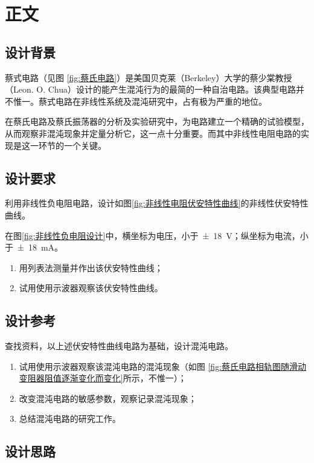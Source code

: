 \documentclass{article}
\begin{document}
\section{正文}%
\label{sec:正文}

\subsection{设计背景}%
\label{sub:设计背景}

蔡式电路（见图 \ref{fig:蔡氏电路}）是美国贝克莱（Berkeley）大学的蔡少棠教授（Leon. O. Chua）设计的能产生混沌行为的最简的一种自治电路。该典型电路并不惟一。蔡式电路在非线性系统及混沌研究中，占有极为严重的地位。

在蔡氏电路及蔡氏振荡器的分析及实验研究中，为电路建立一个精确的试验模型，从而观察非混沌现象并定量分析它，这一点十分重要。而其中非线性电阻电路的实现是这一环节的一个关键。

\subsection{设计要求}%
\label{sub:设计要求}

利用非线性负电阻电路，设计如图\ref{fig:非线性电阻伏安特性曲线}的非线性伏安特性曲线。

在图\ref{fig:非线性负电阻设计}中，横坐标为电压，小于\SI{+-18}{V}；纵坐标为电流，小于\SI{+-18}{mA}。

\begin{enumerate}
	\item 用列表法测量并作出该伏安特性曲线；
	\item 试用使用示波器观察该伏安特性曲线。
\end{enumerate}

\subsection{设计参考}%
\label{sub:设计参考}

查找资料，以上述伏安特性曲线电路为基础，设计混沌电路。

\begin{enumerate}
	\item 试用使用示波器观察该混沌电路的混沌现象（如图 \ref{fig:蔡氏电路相轨图随滑动变阻器阻值逐渐变化而变化}所示，不惟一）；
	\item 改变混沌电路的敏感参数，观察记录混沌现象；
	\item 总结混沌电路的研究工作。
\end{enumerate}

\subsection{设计思路}%
\label{sub:设计思路}
\end{document}
